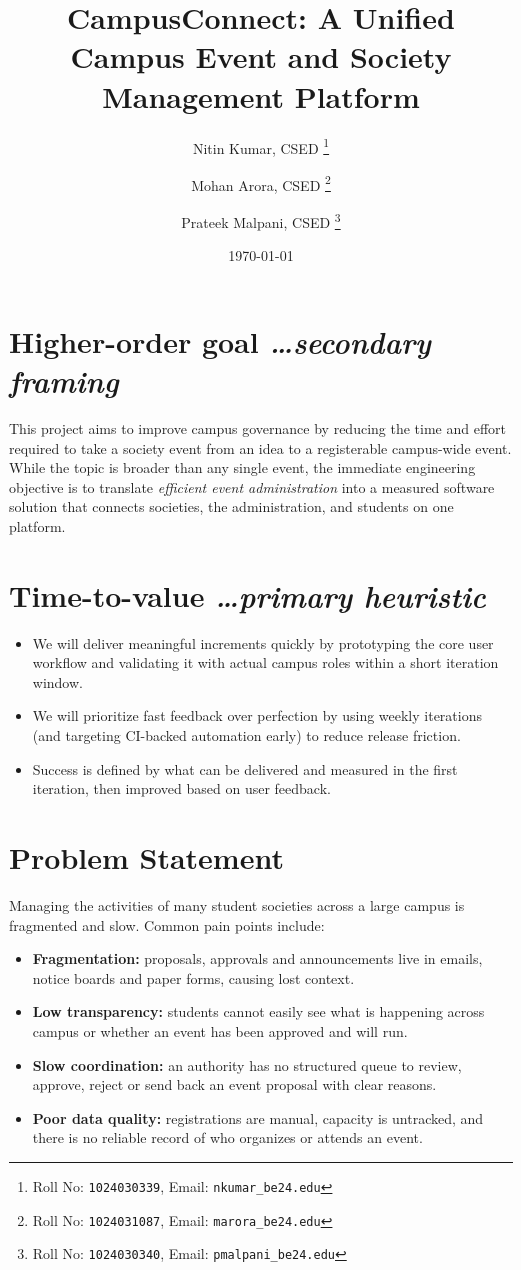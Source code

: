 \documentclass[11pt,a4paper]{article}
\title{CampusConnect: A Unified Campus Event and
  Society Management Platform}
\author{
  Nitin Kumar, CSED%
  \thanks{Roll No: \texttt{1024030339}, %
    Email: \texttt{nkumar\_be24\@thapar.edu}}
  \and 
  Mohan Arora, CSED%
  \thanks{Roll No: \texttt{1024031087}, %
    Email: \texttt{marora\_be24\@thapar.edu}}
  \and 
  Prateek Malpani, CSED%
  \thanks{Roll No: \texttt{1024030340}, %
    Email: \texttt{pmalpani\_be24\@thapar.edu}}
}
\date{\today}
\newcommand{\BvrHint}[1]{%
  {\normalfont\normalsize\itshape\hfill #1}}
\begin{document}
\maketitle

\section{Higher-order goal%
  \BvrHint{\ldots secondary framing}}
This project aims to improve campus governance by
reducing the time and effort required to take a society
event from an idea to a registerable campus-wide event.
While the topic is broader than any single event,
the immediate engineering objective is to translate
\emph{efficient event administration} into a measured
software solution that connects societies, the
administration, and students on one platform.

\section{Time-to-value %
\BvrHint{\ldots primary heuristic}}
\begin{itemize}[leftmargin=0.7cm]
    \item We will deliver meaningful increments quickly by prototyping the core user workflow and validating it with actual campus roles within a short iteration window.
    \item We will prioritize fast feedback over perfection by using weekly iterations (and targeting CI-backed automation early) to reduce release friction.
    \item Success is defined by what can be delivered and measured in the first iteration, then improved based on user feedback.
\end{itemize}

\section{Problem Statement}
Managing the activities of many student societies
across a large campus is fragmented and slow.
Common pain points include:
\begin{itemize}[leftmargin=0.7cm]
    \item \textbf{Fragmentation:} proposals, approvals
      and announcements live in emails, notice boards
      and paper forms, causing lost context.
    \item \textbf{Low transparency:} students cannot
      easily see what is happening across campus or
      whether an event has been approved and will run.
    \item \textbf{Slow coordination:} an authority has
      no structured queue to review, approve, reject or
      send back an event proposal with clear reasons.
    \item \textbf{Poor data quality:} registrations are
      manual, capacity is untracked, and there is no
      reliable record of who organizes or attends an
      event.
\end{itemize}
\end{document}
